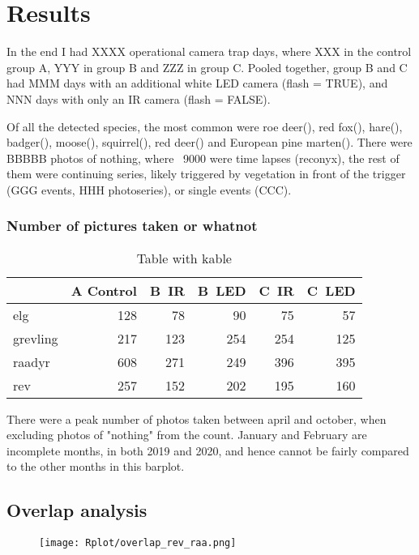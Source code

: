 \chapter{Results}

In the end I had XXXX operational camera trap days, where XXX in the control group A, YYY in group B and ZZZ in group C. Pooled together, group B and C had MMM days with an additional white LED camera (flash = TRUE), and NNN days with only an IR camera (flash = FALSE).  %


Of all the detected species, the most common were roe deer(), red fox(), hare(), badger(), moose(), squirrel(), red deer() and European pine marten(). There were BBBBB photos of nothing, where ~9000 were time lapses (reconyx), the rest of them were continuing series, likely triggered by vegetation in front of the trigger (GGG events, HHH photoseries), or single events (CCC). 


\subsection{Number of pictures taken or whatnot}
\begin{table}

\caption{\label{tab:}Table with kable}
\centering
\begin{tabular}[t]{l|r|r|r|r|r}
\hline
  & A Control & B\ IR & B\ LED & C\ IR & C\ LED\\
\hline
elg & 128 & 78 & 90 & 75 & 57\\
\hline
grevling & 217 & 123 & 254 & 254 & 125\\
\hline
raadyr & 608 & 271 & 249 & 396 & 395\\
\hline
rev & 257 & 152 & 202 & 195 & 160\\
\hline
\end{tabular}
\end{table}

There were a peak number of photos taken between april and october, when excluding photos of "nothing" from the count. January and February are incomplete months, in both 2019 and 2020, and hence cannot be fairly compared to the other months in this barplot. %


\section{Overlap analysis}

\begin{figure}
\centering
\texttt{[image: Rplot/overlap\_rev\_raa.png]}
	\label{fig:overlap_rev_raa}
\end{figure}



